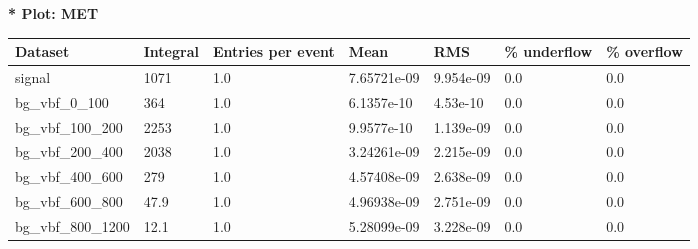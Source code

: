 \documentclass[a4paper, 10pt]{article}
\begin{document}
\textbf{* Plot: MET}\\
   \begin{table}[H]
  \begin{center}
    \begin{tabular}{|m{23.0mm}|m{23.0mm}|m{18.0mm}|m{19.0mm}|m{19.0mm}|m{19.0mm}|m{19.0mm}|}
      \hline
      {\cellcolor{yellow}         Dataset}& {\cellcolor{yellow}         Integral}& {\cellcolor{yellow}         Entries per event}& {\cellcolor{yellow}         Mean}& {\cellcolor{yellow}         RMS}& {\cellcolor{yellow}         \% underflow}& {\cellcolor{yellow}         \% overflow}\\
      \hline
      {\cellcolor{white}         signal}& {\cellcolor{white}         1071}& {\cellcolor{white}         1.0}& {\cellcolor{white}         7.65721e-09}& {\cellcolor{white}         9.954e-09}& {\cellcolor{green}         0.0}& {\cellcolor{green}         0.0}\\
      \hline
      {\cellcolor{white}         bg\_vbf\_0\_100}& {\cellcolor{white}         364}& {\cellcolor{white}         1.0}& {\cellcolor{white}         6.1357e-10}& {\cellcolor{white}         4.53e-10}& {\cellcolor{green}         0.0}& {\cellcolor{green}         0.0}\\
      \hline
      {\cellcolor{white}         bg\_vbf\_100\_200}& {\cellcolor{white}         2253}& {\cellcolor{white}         1.0}& {\cellcolor{white}         9.9577e-10}& {\cellcolor{white}         1.139e-09}& {\cellcolor{green}         0.0}& {\cellcolor{green}         0.0}\\
      \hline
      {\cellcolor{white}         bg\_vbf\_200\_400}& {\cellcolor{white}         2038}& {\cellcolor{white}         1.0}& {\cellcolor{white}         3.24261e-09}& {\cellcolor{white}         2.215e-09}& {\cellcolor{green}         0.0}& {\cellcolor{green}         0.0}\\
      \hline
      {\cellcolor{white}         bg\_vbf\_400\_600}& {\cellcolor{white}         279}& {\cellcolor{white}         1.0}& {\cellcolor{white}         4.57408e-09}& {\cellcolor{white}         2.638e-09}& {\cellcolor{green}         0.0}& {\cellcolor{green}         0.0}\\
      \hline
      {\cellcolor{white}         bg\_vbf\_600\_800}& {\cellcolor{white}         47.9}& {\cellcolor{white}         1.0}& {\cellcolor{white}         4.96938e-09}& {\cellcolor{white}         2.751e-09}& {\cellcolor{green}         0.0}& {\cellcolor{green}         0.0}\\
      \hline
      {\cellcolor{white}         bg\_vbf\_800\_1200}& {\cellcolor{white}         12.1}& {\cellcolor{white}         1.0}& {\cellcolor{white}         5.28099e-09}& {\cellcolor{white}         3.228e-09}& {\cellcolor{green}         0.0}& {\cellcolor{green}         0.0}\\

\end{tabular}
\end{center}
\end{table}
\end{document}
